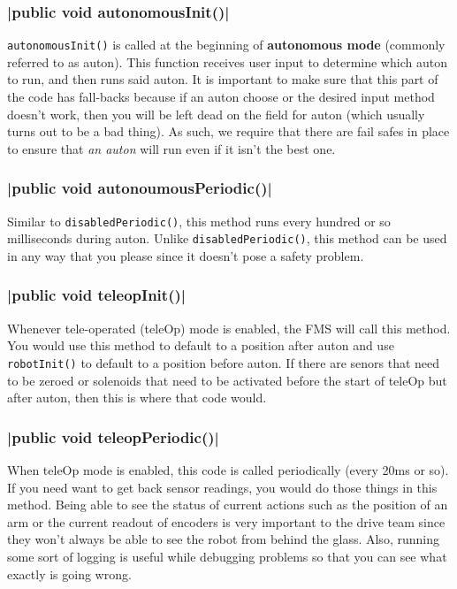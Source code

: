 \documentclass[11pt,fleqn]{article}
\begin{document}
\subsubsection{|public void autonomousInit()|}
\texttt{autonomousInit()} is called at the beginning of \textbf{autonomous mode} (commonly referred to
as auton). This function receives user input to determine which auton to run, and then runs said auton.
It is important to make sure that this part of the code has fall-backs because if an auton choose or the
desired input method doesn't work, then you will be left dead on the field for auton (which usually turns
out to be a bad thing). As such, we require that there are fail safes in place to ensure that \textit
{an auton} will run even if it isn't the best one.

\subsubsection{|public void autonoumousPeriodic()|}
Similar to \texttt{disabledPeriodic()}, this method runs every hundred or so milliseconds during auton.
Unlike \texttt{disabledPeriodic()}, this method can be used in any way that you please since it doesn't
pose a safety problem.

\subsubsection{|public void teleopInit()|}
Whenever tele-operated (teleOp) mode is enabled, the FMS will call this method. You would use this method
to default to a position after auton and use \texttt{robotInit()} to default to a position before auton.
If there are senors that need to be zeroed or solenoids that need to be activated before the start of
teleOp but after auton, then this is where that code would. 

\subsubsection{|public void teleopPeriodic()|}
When teleOp mode is enabled, this code is called periodically (every 20ms or so). If you need want to
get back sensor readings, you would do those things in this method. Being able to see the status of current
actions such as the position of an arm or the current readout of encoders is very important to the drive
team since they won't always be able to see the robot from behind the glass. Also, running some sort of
logging is useful while debugging problems so that you can see what exactly is going wrong. 
\end{document}
